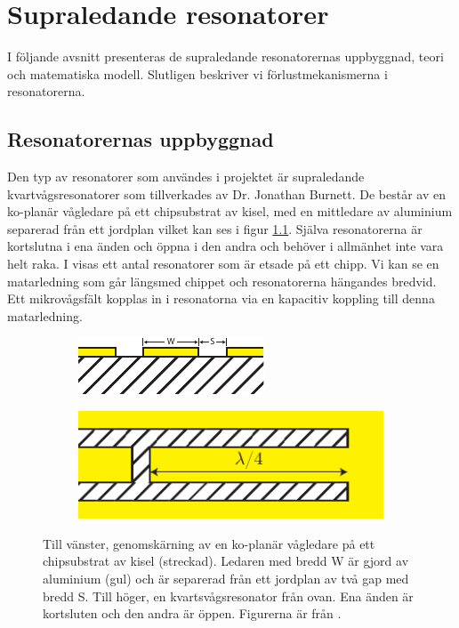 \documentclass[main.tex]{subfiles}
\begin{document}
\chapter{Supraledande resonatorer}
I följande avsnitt presenteras de supraledande resonatorernas uppbyggnad, teori och matematiska modell. Slutligen beskriver vi förlustmekanismerna i resonatorerna.

\section{Resonatorernas uppbyggnad}

Den typ av resonatorer som användes i projektet är supraledande kvartvågsresonatorer som tillverkades av Dr. Jonathan Burnett. De består av en ko-planär vågledare på ett chipsubstrat av kisel, med en mittledare av aluminium separerad från ett jordplan \cite{Boehme2016} vilket kan ses i figur \ref{fig:chipsubstrat}. Själva resonatorerna är kortslutna i ena änden och öppna i den andra och behöver i allmänhet inte vara helt raka. I  visas ett antal resonatorer som är etsade på ett chipp. Vi kan se en matarledning som går längsmed chippet och resonatorerna hängandes bredvid. Ett mikrovågsfält kopplas in i resonatorna via en kapacitiv koppling till denna matarledning.

\begin{figure}[H]
\centering
\begin{subfigure}{0.45\textwidth}
  \centering
  \includegraphics[width=0.8\linewidth]{figure/chipsubstrat.pdf}
\end{subfigure}%
\begin{subfigure}{.45\textwidth}
  \centering
  \includegraphics[width=0.8\linewidth]{figure/chipsubstrat2.pdf}
\end{subfigure}
\caption{Till vänster, genomskärning av en ko-planär vågledare på ett chipsubstrat av kisel (streckad). Ledaren med bredd W är gjord av aluminium (gul) och är separerad från ett jordplan av två gap med bredd S. Till höger, en kvartsvågsresonator från ovan. Ena änden är kortsluten och den andra är öppen. Figurerna är från \cite[fig. 2.1]{Boehme2016}.}
\label{fig:chipsubstrat}
\end{figure}
\end{document}
